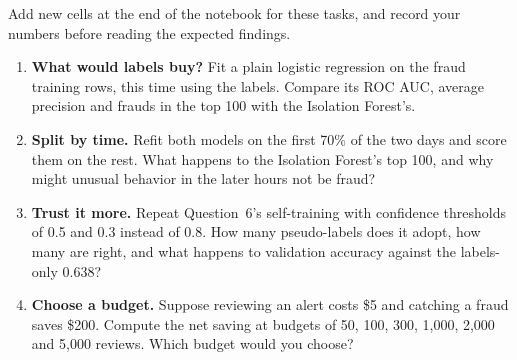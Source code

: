 
\begin{yourturn}
Add new cells at the end of the notebook for these tasks, and record your numbers before reading the expected findings.
\begin{enumerate}
  \item \textbf{What would labels buy?} Fit a plain logistic regression on the fraud training rows, this time using the labels. Compare its ROC AUC, average precision and frauds in the top 100 with the Isolation Forest's.
  \item \textbf{Split by time.} Refit both models on the first 70\% of the two days and score them on the rest. What happens to the Isolation Forest's top 100, and why might unusual behavior in the later hours not be fraud?
  \item \textbf{Trust it more.} Repeat Question~6's self-training with confidence thresholds of 0.5 and 0.3 instead of 0.8. How many pseudo-labels does it adopt, how many are right, and what happens to validation accuracy against the labels-only 0.638?
  \item \textbf{Choose a budget.} Suppose reviewing an alert costs \$5 and catching a fraud saves \$200. Compute the net saving at budgets of 50, 100, 300, 1,000, 2,000 and 5,000 reviews. Which budget would you choose?
\end{enumerate}
\end{yourturn}

